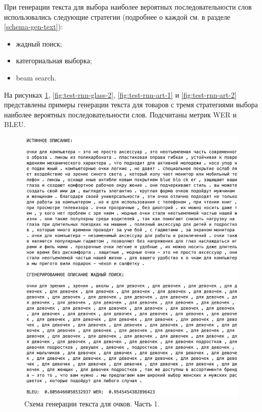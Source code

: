 \documentclass[a4paper,12pt]{extarticle}
\begin{document}
При генерации текста для выбора наиболее вероятных последовательности слов использовались следующие стратегии (подробнее о каждой см. в разделе \ref{schema-gen-text}):
\begin{itemize}
	\item жадный поиск;
	\item категориальная выборка;
	\item beam search.
\end{itemize}

На рисунках \ref{fig:test-rnn-glass-1}, \ref{fig:test-rnn-glass-2}, \ref{fig:test-rnn-art-1} и \ref{fig:test-rnn-art-2} представлены примеры генерации текста для товаров с тремя стратегиями выбора наиболее вероятных последовательности слов. Подсчитаны метрик WER и BLEU.

\begin{figure}[ht]
	\centering
	\includegraphics[scale=0.4]{test-rnn-glass-1.png}
	\caption{Cхема генерации текста для очков. Часть 1.}
	\label{fig:test-rnn-glass-1}
\end{figure}
\end{document}
